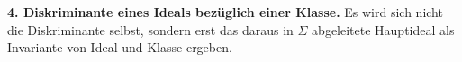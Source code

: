 \textbf{4. Diskriminante eines Ideals bezüglich einer Klasse.} Es wird sich nicht die Diskriminante selbst, sondern erst das daraus in $\Sigma$ abgeleitete Hauptideal als Invariante von Ideal und Klasse ergeben.